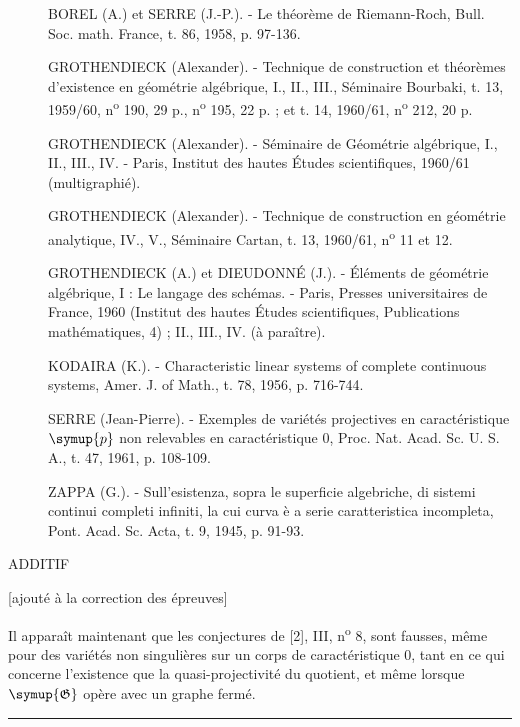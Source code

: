\begin{description}
\item[{\normalfont[1]}] BOREL (A.) et SERRE (J.-P.). - Le théorème de Riemann-Roch,
Bull. Soc. math. France, t. 86, 1958, p. 97-136.

\item[{\normalfont[2]}] GROTHENDIECK (Alexander). - Technique de construction et
théorèmes d'existence en géométrie algébrique, I., II., III., Séminaire
Bourbaki, t. 13, 1959/60, n\textsuperscript{o} 190, 29 p.,
n\textsuperscript{o} 195, 22 p. ; et t. 14, 1960/61,
n\textsuperscript{o} 212, 20 p.

\item[{\normalfont[3]}] GROTHENDIECK (Alexander). - Séminaire de Géométrie algébrique,
I., II., III., IV. - Paris, Institut des hautes Études scientifiques, 1960/61
(multigraphié).

\item[{\normalfont[4]}] GROTHENDIECK (Alexander). - Technique de construction en
géométrie analytique, IV., V., Séminaire Cartan, t. 13, 1960/61,
n\textsuperscript{o} 11 et 12.

\item[{\normalfont[5]}] GROTHENDIECK (A.) et DIEUDONNÉ (J.). - Éléments de
géométrie algébrique, I : Le langage des schémas. - Paris, Presses
universitaires de France, 1960 (Institut des hautes Études scientifiques,
Publications mathématiques, 4) ; II., III., IV. (à paraître).

\item[{\normalfont[6]}] KODAIRA (K.). - Characteristic linear systems of complete
continuous systems, Amer. J. of Math., t. 78, 1956, p. 716-744.

\item[{\normalfont[7]}] SERRE (Jean-Pierre). - Exemples de variétés projectives en
caractéristique $\symup{p}$ non relevables en caractéristique 0, Proc. Nat. Acad.
Sc. U. S. A., t. 47, 1961, p. 108-109.

\item[{\normalfont[8]}] ZAPPA (G.). - Sull'esistenza, sopra le superficie algebriche, di
sistemi continui completi infiniti, la cui curva è a serie caratteristica
incompleta, Pont. Acad. Sc. Acta, t. 9, 1945, p. 91-93.
\end{description}

\begin{center}ADDITIF\end{center}
\begin{center}
[ajouté à la correction des épreuves]
\end{center}

Il apparaît maintenant que les conjectures de [2], III,
n\textsuperscript{o} 8, sont fausses, même pour des variétés non singulières sur
un corps de caractéristique 0, tant en ce qui concerne l'existence que la
quasi-projectivité du quotient, et même lorsque $\symup{\mathfrak G}$ opère avec un graphe fermé.

\begin{center}
  \rule{.14\linewidth}{.3pt}
\end{center}
